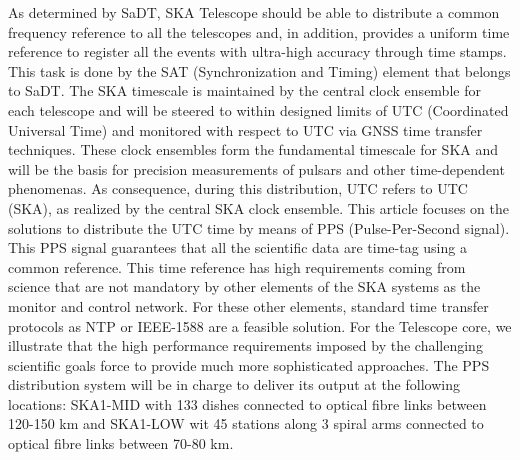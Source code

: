 As determined by SaDT, SKA Telescope should be able to distribute a common frequency reference to all the telescopes and, in addition, provides a uniform time reference to register all the events with ultra-high accuracy through time stamps. This task is done by the SAT (Synchronization and Timing) element that belongs to SaDT. The SKA timescale is maintained by the central clock ensemble for each telescope and will be steered to within designed limits of UTC (Coordinated Universal Time) and monitored with respect to UTC via GNSS time transfer techniques. These clock ensembles form the fundamental timescale for SKA and will be the basis for precision measurements of pulsars and other time-dependent phenomenas. As consequence, during this distribution, UTC refers to UTC (SKA), as realized by the central SKA clock ensemble.
This article focuses on the solutions to distribute the UTC time by means of PPS (Pulse-Per-Second signal). This PPS signal guarantees that all the scientific data are time-tag using a common reference. This time reference has high requirements coming from science that are not mandatory by other elements of the SKA systems as the monitor and control network. For these other elements, standard time transfer protocols as NTP or IEEE-1588 are a feasible solution. For the Telescope core, we illustrate that the high performance requirements imposed by the challenging scientific goals force to provide much more sophisticated approaches. 
The PPS distribution system will be in charge to deliver its output at the following locations: SKA1-MID with 133 dishes connected to optical fibre links between 120-150 km and SKA1-LOW wit 45 stations along 3 spiral arms connected to optical fibre links between 70-80 km.

